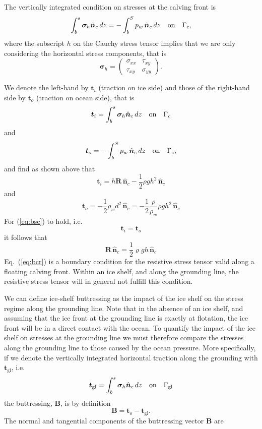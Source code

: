 \documentclass[10pt,a4paper]{book}
\newcommand{\txy}{\tau_{xy}}
\newcommand{\sxx}{\sigma_{xx}}
\newcommand{\syy}{\sigma_{yy}}
\newcommand{\normalc}{\hat{\bm{n}}_{c}}
\newcommand{\tgl}{\bm{t}_{\mathrm{gl}}}
\newcommand{\tO}{\bm{t}_o}
\begin{document}
The vertically integrated condition on stresses at the calving front is
\begin{equation}
\int_b^s \bm{\sigma}_h  \normalc \, dz = - \int_b^S p_w \, \normalc  \, dz \quad \hbox{on} \quad \Gamma_c ,
\label{eq:bsc}
\end{equation}
where the subscript $h$ on the Cauchy stress tensor implies that we
are only considering the horizontal stress components, that is
\begin{equation}
\bm{\sigma}_h=\begin{pmatrix}  \sxx & \txy \\ \txy & \syy  \end{pmatrix}.
\label{eq:sh}
\end{equation}



We denote the left-hand by $\bm{t}_i$ (traction on ice side) and
those of the right-hand side by $\bm{t}_o$ (traction on ocean side), that is
\[
\bm{t}_i=\int_b^s \bm{\sigma}_h  \normalc \, dz \quad \hbox{on} \quad \Gamma_c
\]
and
\[
\bm{t}_o= - \int_b^S p_w \, \normalc  \, dz \quad \hbox{on} \quad \Gamma_c ,
\]
and find as shown above that
\[
\bm{t}_i=h \bm{R} \, \normalc - \frac{1}{2} \rho g h^2 \, \normalc
\]
and
\[
 \bm{t}_o= -\frac{1}{2} \rho_w d^2 \, \normalc= - \frac{1}{2} \frac{\rho}{\rho_w} \rho g h^2 \, \normalc
\]
For (\ref{eq:bsc}) to hold, i.e.\
\[
\bm{t}_i=\bm{t}_o
\]
it follows that
\begin{equation}
 \bm{R} \, \normalc =\frac{1}{2} \varrho g h \, \normalc
 \label{eq:bcr}
 \end{equation}
Eq.~(\ref{eq:bcr}) is a boundary condition for the resistive stress
tensor valid along a floating calving front.  Within an ice shelf, and along
the grounding line, the resistive stress tensor will in general not
fulfill this condition.


We can define ice-shelf buttressing as the impact of the ice shelf on
the stress regime along the grounding line. Note that in the absence
of an ice shelf, and assuming that the ice front at the grounding line
is exactly at flotation, the ice front will be in a direct contact
with the ocean.  To quantify the impact of the ice shelf on stresses
at the grounding line we must therefore compare the stresses along the
grounding line to those caused by the ocean pressure.  More
specifically, if we denote the vertically integrated horizontal
traction along the grounding with $\tgl$, i.e.\
\begin{equation}
\tgl=\int_b^s \bm{\sigma}_h  \normalc \, dz \quad \hbox{on} \quad \Gamma_{\mathrm{gl}}
\end{equation}
the buttressing, $\bm{B}$,  is by definition
\begin{equation}
\bm{B}=\tO-\tgl .
\end{equation}
The normal and tangential components of the buttressing vector $\bm{B}$ are
\end{document}

